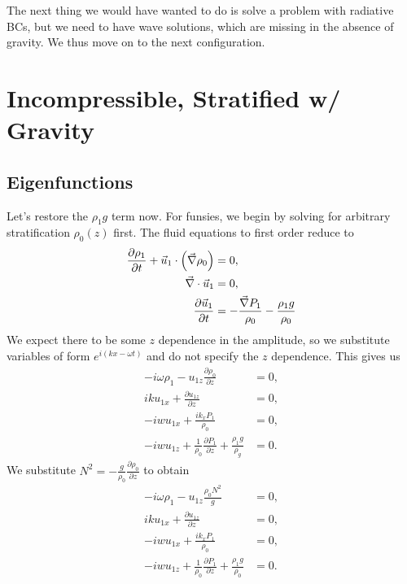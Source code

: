 \documentclass[11pt,
        usenames, %
        dvipsnames %
    ]{report}
\newcommand*{\pd}[2]{\frac{\partial#1}{\partial#2}}
\DeclarePairedDelimiter\p{\lparen}{\rparen}
\begin{document}
The next thing we would have wanted to do is solve a problem with radiative BCs,
but we need to have wave solutions, which are missing in the absence of gravity.
We thus move on to the next configuration.

\section{Incompressible, Stratified w/ Gravity}

\subsection{Eigenfunctions}

Let's restore the $\rho_1 g$ term now. For funsies, we begin by solving for
arbitrary stratification $\rho_0(z)$ first. The fluid equations to first order
reduce to
\begin{equation}
    \begin{split}
        \pd{\rho_1}{t} + \vec{u}_1 \cdot \p*{\vec{\nabla}\rho_0} &= 0,\\
        \vec{\nabla} \cdot \vec{u}_1 &= 0,\\
        \pd{\vec{u}_1}{t} &= -\frac{\vec{\nabla}P_1}{\rho_0}
            - \frac{\rho_1 g}{\rho_0}
    \end{split}\label{eq:lin_incomp}
\end{equation}
We expect there to be some $z$ dependence in the amplitude, so we substitute
variables of form $e^{i(kx - \omega t)}$ and do not specify the $z$ dependence.
This gives us
\begin{equation}
    \begin{split}
        -i\omega \rho_1 - u_{1z}\pd{\rho_0}{z} &= 0,\\
        iku_{1x} + \pd{u_{1z}}{z} &= 0,\\
        -iw u_{1x} + \frac{ik_x P_1}{\rho_0} &= 0,\\
        -iw u_{1z} + \frac{1}{\rho_0}\pd{P_1}{z} +
            \frac{\rho_1 g}{\rho_g} &= 0.
    \end{split}
\end{equation}
We substitute $N^2 = -\frac{g}{\rho_0}\pd{\rho_0}{z}$ to obtain
\begin{subequations}
    \begin{align}
        -i\omega \rho_1 - u_{1z}\frac{\rho_0N^2}{g} &= 0,\label{eq:lin.cont}\\
        iku_{1x} + \pd{u_{1z}}{z} &= 0,\label{eq:lin.div}\\
        -iw u_{1x} + \frac{ik_x P_1}{\rho_0} &= 0,\label{eq:lin.mom_x}\\
        -iw u_{1z} + \frac{1}{\rho_0}\pd{P_1}{z} +
            \frac{\rho_1g}{\rho_0} &= 0.\label{eq:lin.mom_z}
    \end{align}
\end{subequations}
\end{document}
